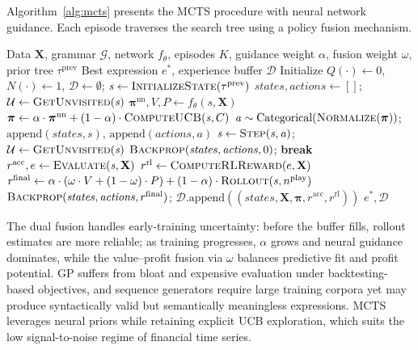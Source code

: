 \documentclass{elektr}
\theoremstyle{corollary}
\theoremstyle{lemma}
\theoremstyle{proposition}
\theoremstyle{axiom}
\theoremstyle{conjecture}
\theoremstyle{example}
\theoremstyle{definition}
\theoremstyle{remark}
\begin{document}
Algorithm~\ref{alg:mcts} presents the MCTS procedure with neural network guidance. Each episode traverses the search tree using a policy fusion mechanism.

\begin{algorithm}[htbp]
\caption{Neural-Guided MCTS for Symbolic Regression}
\label{alg:mcts}
\begin{algorithmic}[1]
\Require Data $\mathbf{X}$, grammar $\mathcal{G}$, network $f_{\theta}$, episodes $K$, guidance weight $\alpha$, fusion weight $\omega$, prior tree $\tau^{\text{prev}}$
\Ensure Best expression $e^{*}$, experience buffer $\mathcal{D}$
\State Initialize $Q(\cdot) \leftarrow 0$, $N(\cdot) \leftarrow 1$, $\mathcal{D} \leftarrow \emptyset$; $\mathit{s} \leftarrow \textsc{InitializeState}(\tau^{\text{prev}})$
    \State $\mathit{states}, \mathit{actions} \leftarrow []$; $\mathcal{U} \leftarrow \textsc{GetUnvisited}(\mathit{s})$
     
        \State $\boldsymbol{\pi}^{\text{nn}}, V, P \leftarrow f_{\theta}(\mathit{s}, \mathbf{X})$
        \State $\boldsymbol{\pi} \leftarrow \alpha \cdot \boldsymbol{\pi}^{\text{nn}} + (1-\alpha) \cdot \textsc{ComputeUCB}(\mathit{s}, C)$
        \State $\mathit{a} \sim \text{Categorical}(\textsc{Normalize}(\boldsymbol{\pi}))$; $\text{append}(\mathit{states}, \mathit{s})$, $\text{append}(\mathit{actions}, \mathit{a})$
        \State $\mathit{s} \leftarrow \textsc{Step}(\mathit{s}, \mathit{a})$; $\mathcal{U} \leftarrow \textsc{GetUnvisited}(\mathit{s})$
         \State $\textsc{Backprop}(\mathit{states}, \mathit{actions}, 0)$; \textbf{break} \EndIf
    \EndWhile
    \State $r^{\text{acc}}, e \leftarrow \textsc{Evaluate}(\mathit{s}, \mathbf{X})$ 
    \State $r^{\text{rl}} \leftarrow \textsc{ComputeRLReward}(e, \mathbf{X})$ 
    \State $r^{\text{final}} \leftarrow \alpha \cdot (\omega \cdot V + (1-\omega) \cdot P) + (1-\alpha) \cdot \textsc{Rollout}(\mathit{s}, n^{\text{play}})$
    \State $\textsc{Backprop}(\mathit{states}, \mathit{actions}, r^{\text{final}})$; $\mathcal{D}.\text{append}((\mathit{states}, \mathbf{X}, \boldsymbol{\pi}, r^{\text{acc}}, r^{\text{rl}}))$
\EndFor
\State \Return $e^{*}, \mathcal{D}$
\end{algorithmic}
\end{algorithm}

The dual fusion handles early-training uncertainty: before the buffer fills, rollout estimates are more reliable; as training progresses, $\alpha$ grows and neural guidance dominates, while the value--profit fusion via $\omega$ balances predictive fit and profit potential. GP suffers from bloat and expensive evaluation under backtesting-based objectives, and sequence generators require large training corpora yet may produce syntactically valid but semantically meaningless expressions. MCTS leverages neural priors while retaining explicit UCB exploration, which suits the low signal-to-noise regime of financial time series.
\end{document}
